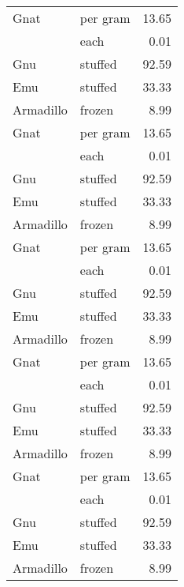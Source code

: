 {\begin{center}
\begin{xtabular}{|l||l|r|}
Gnat      & per gram & 13.65 \\
          & each     & 0.01  \\
Gnu       & stuffed  & 92.59 \\
Emu       & stuffed  & 33.33 \\
Armadillo & frozen   & 8.99  \\
Gnat      & per gram & 13.65 \\
          & each     & 0.01  \\
Gnu       & stuffed  & 92.59 \\
Emu       & stuffed  & 33.33 \\
Armadillo & frozen   & 8.99  \\
Gnat      & per gram & 13.65 \\
          & each     & 0.01  \\
Gnu       & stuffed  & 92.59 \\
Emu       & stuffed  & 33.33 \\
Armadillo & frozen   & 8.99  \\
Gnat      & per gram & 13.65 \\
          & each     & 0.01  \\
Gnu       & stuffed  & 92.59 \\
Emu       & stuffed  & 33.33 \\
Armadillo & frozen   & 8.99  \\
Gnat      & per gram & 13.65 \\
          & each     & 0.01  \\
Gnu       & stuffed  & 92.59 \\
Emu       & stuffed  & 33.33 \\
Armadillo & frozen   & 8.99  \\
\hline
\end{xtabular}
\end{center}
} 
